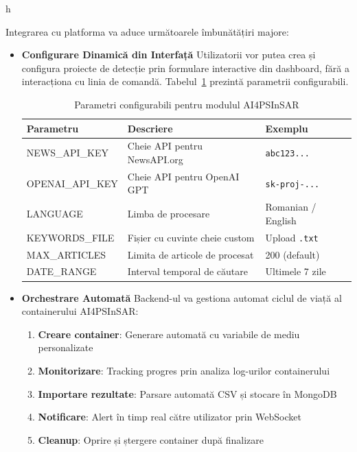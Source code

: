 h\documentclass[12pt,a4paper]{article}
\begin{document}
Integrarea cu platforma va aduce următoarele îmbunătățiri majore:
\begin{itemize}
    \item \textbf{Configurare Dinamică din Interfață}
    Utilizatorii vor putea crea și configura proiecte de detecție prin formulare interactive din dashboard, fără a interacționa cu linia de comandă. Tabelul~\ref{tab:config-params} prezintă parametrii configurabili.
        \begin{table}[ht]
        \centering
        \small
        \begin{tabular}{|l|p{5.5cm}|l|}
        \hline
        \textbf{Parametru} & \textbf{Descriere} & \textbf{Exemplu} \\ \hline
        NEWS\_API\_KEY & Cheie API pentru NewsAPI.org & \texttt{abc123...} \\ \hline
        OPENAI\_API\_KEY & Cheie API pentru OpenAI GPT & \texttt{sk-proj-...} \\ \hline
        LANGUAGE & Limba de procesare & Romanian / English \\ \hline
        KEYWORDS\_FILE & Fișier cu cuvinte cheie custom & Upload \texttt{.txt} \\ \hline
        MAX\_ARTICLES & Limita de articole de procesat & 200 (default) \\ \hline
        DATE\_RANGE & Interval temporal de căutare & Ultimele 7 zile \\ \hline
        \end{tabular}
        \caption{Parametri configurabili pentru modulul AI4PSInSAR}
        \label{tab:config-params}
        \end{table}

    \item \textbf{Orchestrare Automată}
        Backend-ul va gestiona automat ciclul de viață al containerului AI4PSInSAR:
        \begin{enumerate}
            \item \textbf{Creare container}: Generare automată cu variabile de mediu personalizate
            \item \textbf{Monitorizare}: Tracking progres prin analiza log-urilor containerului
            \item \textbf{Importare rezultate}: Parsare automată CSV și stocare în MongoDB
            \item \textbf{Notificare}: Alert în timp real către utilizator prin WebSocket
            \item \textbf{Cleanup}: Oprire și ștergere container după finalizare
        \end{enumerate}
            

\end{itemize}
\end{document}
